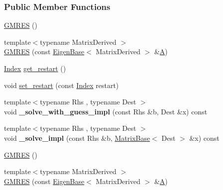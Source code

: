 \subsubsection*{Public Member Functions}
\begin{DoxyCompactItemize}
\item 
\hyperlink{group___iterative_linear_solvers___module_a73153e328dfa402cb3640711289f2985}{G\+M\+R\+ES} ()
\item 
{\footnotesize template$<$typename Matrix\+Derived $>$ }\\\hyperlink{group___iterative_linear_solvers___module_a9ceeeb826c7e60ee948c0d1c0a219607}{G\+M\+R\+ES} (const \hyperlink{group___core___module_struct_eigen_1_1_eigen_base}{Eigen\+Base}$<$ Matrix\+Derived $>$ \&\hyperlink{group___core___module_class_eigen_1_1_matrix}{A})
\item 
\hyperlink{namespace_eigen_a62e77e0933482dafde8fe197d9a2cfde}{Index} \hyperlink{group___iterative_linear_solvers___module_ade721328e58ace2d4493cbdcbe53ad09}{get\+\_\+restart} ()
\item 
void \hyperlink{group___iterative_linear_solvers___module_ac50d6bbca4a8a275861770feb211900d}{set\+\_\+restart} (const \hyperlink{namespace_eigen_a62e77e0933482dafde8fe197d9a2cfde}{Index} restart)
\item 
\mbox{\label{group___iterative_linear_solvers___module_adc20d4ab02968fbe171dc6d6e82f3b82}} 
{\footnotesize template$<$typename Rhs , typename Dest $>$ }\\void {\bfseries \+\_\+solve\+\_\+with\+\_\+guess\+\_\+impl} (const Rhs \&b, Dest \&x) const
\item 
\mbox{\label{group___iterative_linear_solvers___module_a8064e57ae70670b4023c0d5c7c340049}} 
{\footnotesize template$<$typename Rhs , typename Dest $>$ }\\void {\bfseries \+\_\+solve\+\_\+impl} (const Rhs \&b, \hyperlink{group___core___module_class_eigen_1_1_matrix_base}{Matrix\+Base}$<$ Dest $>$ \&x) const
\item 
\hyperlink{group___iterative_linear_solvers___module_a73153e328dfa402cb3640711289f2985}{G\+M\+R\+ES} ()
\item 
{\footnotesize template$<$typename Matrix\+Derived $>$ }\\\hyperlink{group___iterative_linear_solvers___module_a9ceeeb826c7e60ee948c0d1c0a219607}{G\+M\+R\+ES} (const \hyperlink{group___core___module_struct_eigen_1_1_eigen_base}{Eigen\+Base}$<$ Matrix\+Derived $>$ \&\hyperlink{group___core___module_class_eigen_1_1_matrix}{A})

\end{DoxyCompactItemize}
